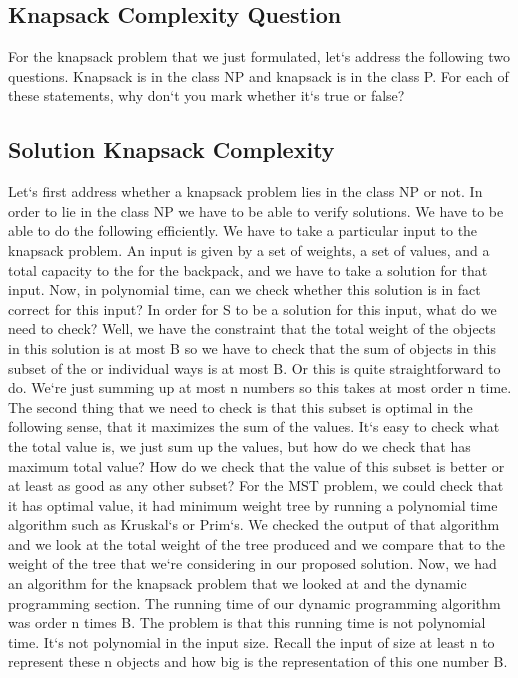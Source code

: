 \subsection{Knapsack Complexity Question}
For the knapsack problem that we just formulated, let`s address the following two questions.
Knapsack is in the class NP and knapsack is in the class P\@.
For each of these statements, why don`t you mark whether it`s true or false?

\subsection{Solution  Knapsack Complexity}
Let`s first address whether a knapsack problem lies in the class NP or not.
In order to lie in the class NP we have to be able to verify solutions.
We have to be able to do the following efficiently.
We have to take a particular input to the knapsack problem.
An input is given by a set of weights, a set of values, and a total capacity to the for the backpack, and we have to take a solution for that input.
Now, in polynomial time, can we check whether this solution is in fact correct for this input? In order for S to be a solution for this input, what do we need to check? Well, we have the constraint that the total weight of the objects in this solution is at most B so we have to check that the sum of objects in this subset of the or individual ways is at most B\@.
Or this is quite straightforward to do.
We`re just summing up at most n numbers so this takes at most order n time.
The second thing that we need to check is that this subset is optimal in the following sense, that it maximizes the sum of the values.
It`s easy to check what the total value is, we just sum up the values, but how do we check that has maximum total value? How do we check that the value of this subset is better or at least as good as any other subset? For the MST problem, we could check that it has optimal value, it had minimum weight tree by running a polynomial time algorithm such as Kruskal`s or Prim`s.
We checked the output of that algorithm and we look at the total weight of the tree produced and we compare that to the weight of the tree that we`re considering in our proposed solution.
Now, we had an algorithm for the knapsack problem that we looked at and the dynamic programming section.
The running time of our dynamic programming algorithm was order n times B\@.
The problem is that this running time is not polynomial time.
It`s not polynomial in the input size.
Recall the input of size at least n to represent these n objects and how big is the representation of this one number B\@.
